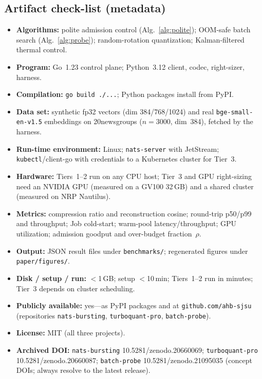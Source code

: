 \documentclass[conference]{IEEEtran}
\begin{document}
\subsection{Artifact check-list (metadata)}
\begin{itemize}\itemsep1pt
\item \textbf{Algorithms:} polite admission control (Alg.~\ref{alg:polite}); OOM-safe batch
search (Alg.~\ref{alg:probe}); random-rotation quantization; Kalman-filtered thermal control.
\item \textbf{Program:} Go~1.23 control plane; Python~3.12 client, codec, right-sizer, harness.
\item \textbf{Compilation:} \texttt{go build ./...}; Python packages install from PyPI.
\item \textbf{Data set:} synthetic fp32 vectors (dim 384/768/1024) and real
\texttt{bge-small-en-v1.5} embeddings on 20newsgroups ($n{=}3000$, dim~384), fetched by the harness.
\item \textbf{Run-time environment:} Linux; \texttt{nats-server} with JetStream;
\texttt{kubectl}/client-go with credentials to a Kubernetes cluster for Tier~3.
\item \textbf{Hardware:} Tiers~1--2 run on any CPU host; Tier~3 and GPU right-sizing need an
NVIDIA GPU (measured on a GV100 32\,GB) and a shared cluster (measured on NRP Nautilus).
\item \textbf{Metrics:} compression ratio and reconstruction cosine; round-trip p50/p99 and
throughput; Job cold-start; warm-pool latency/throughput; GPU utilization; admission goodput
and over-budget fraction~$\rho$.
\item \textbf{Output:} JSON result files under \texttt{benchmarks/}; regenerated figures under
\texttt{paper/figures/}.
\item \textbf{Disk / setup / run:} $<$1\,GB; setup $<$10\,min; Tiers~1--2 run in minutes; Tier~3
depends on cluster scheduling.
\item \textbf{Publicly available:} yes---as PyPI packages and at
\texttt{github.com/ahb-sjsu} (repositories \texttt{nats-bursting}, \texttt{turboquant-pro},
\texttt{batch-probe}).
\item \textbf{License:} MIT (all three projects).
\item \textbf{Archived DOI:} \texttt{nats-bursting} 10.5281/zenodo.20660069;
\texttt{turboquant-pro} 10.5281/zenodo.20660087; \texttt{batch-probe} 10.5281/zenodo.21095035
(concept DOIs; always resolve to the latest release).
\end{itemize}
\end{document}

